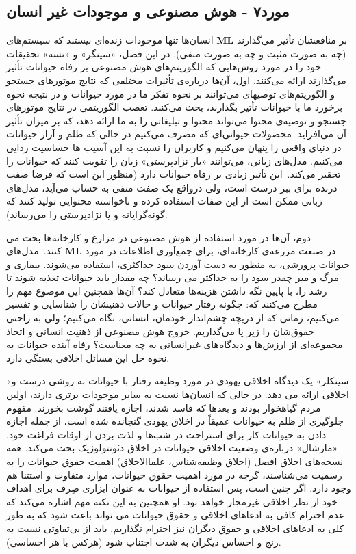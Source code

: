 \subsection*{مورد۷ - هوش مصنوعی و موجودات غیر انسان}
\label{subsec:مورد۷ - هوش مصنوعی و موجودات غیر انسان}
انسان‌ها تنها موجودات زنده‌ای نیستند که سیستم‌های \textenglish{\textbf{ML}} بر منافعشان تأثیر می‌گذارند (چه به صورت مثبت و چه به صورت منفی).
در این فصل، «سینگر» و «تسه» تحقیقات خود را در مورد روش‌هایی که الگوریتم‌های هوش مصنوعی بر رفاه حیوانات تأثیر می‌گذارند ارائه می‌کنند.
اول، آن‌ها درباره‌ی تأثیرات مختلفی که نتایج موتورهای جستجو و الگوریتم‌های توصیهای می‌توانند بر نحوه تفکر ما در مورد حیوانات و در نتیجه نحوه برخورد ما با حیوانات تأثیر بگذارند، بحث می‌کنند.
تعصب الگوریتمی در نتایج موتورهای جستجو و توصیه‌ی محتوا می‌تواند محتوا و تبلیغاتی را به ما ارائه دهد، که بر میزان تأثیر آن می‌افزاید.
محصولات حیوانی‌ای که مصرف می‌کنیم در حالی که ظلم و آزار حیوانات در دنیای واقعی را پنهان می‌کنیم و کاربران را نسبت به این آسیب ها حساسیت زدایی می‌کنیم.
مدل‌های زبانی، می‌توانند «بار نزادپرستی» زبان را تقویت کنند که حیوانات را تحقیر می‌کند.\     این تأثیر زیادی بر رفاه حیوانات دارد (منظور این است که فرضا صفت درنده برای ببر درست است، ولی درواقع یک صفت منفی به حساب می‌آید، مدل‌های زبانی ممکن است از این صفات استفاده کرده و ناخواسته محتوایی تولید کنند که گونه‌گرایانه و یا نژادپرستی را می‌رساند).

دوم، آن‌ها در مورد استفاده از هوش مصنوعی در مزارع و کارخانه‌ها بحث می کنند.\     مدل‌های \textenglish{\textbf{ML}} در صنعت مزرعه‌ی کارخانه‌ای، برای جمع‌آوری اطلاعات در مورد حیوانات پرورشی، به منظور به دست آوردن سود حداکثری، استفاده می‌شوند.
بیماری و مرگ و میر چقدر سود را به حداکثر می رساند؟ چه مقدار باید حیوانات تغذیه شوند تا رشد را، با پایین نگه داشتن هزینه‌ها متعادل کند؟ آن‌ها همچنین این موضوع مهم را مطرح می‌کنند که: چگونه رفتار حیوانات و حالات ذهنیشان را شناسایی و تفسیر می‌کنیم، زمانی که از دریچه چشم‌انداز خودمان، انسانی، نگاه می‌کنیم؛ ولی به راحتی حقوق‌شان را زیر پا می‌گذاریم.
خروج هوش مصنوعی از ذهنیت انسانی و اتخاذ مجموعه‌ای از ارزش‌ها و دیدگاه‌های غیرانسانی به چه معناست؟ رفاه آینده حیوانات به نحوه حل این مسائل اخلاقی بستگی دارد.

«سینکلر» یک دیدگاه اخلاقی یهودی در مورد وظیفه رفتار با حیوانات به روشی درست و اخلاقی ارائه می دهد.
در حالی که انسان‌ها نسبت به سایر موجودات برتری دارند، اولین مردم گیاهخوار بودند و بعدها که فاسد شدند، اجازه یافتند گوشت بخورند.
مفهوم جلوگیری از ظلم به حیوانات عمیقاً در اخلاق یهودی گنجانده شده است، از جمله اجازه دادن به حیوانات کار برای استراحت در شب‌ها و لذت بردن از اوقات فراغت خود.
«مارشال» درباره‌ی وضعیت اخلاقی حیوانات در اخلاق دئونتولوژیک بحث می‌کند.
همه نسخه‌های اخلاق افضل (اخلاق وظیفه‌شناس، علماالاخلاق) اهمیت حقوق حیوانات را به رسمیت می‌شناسند، گرچه در مورد اهمیت حقوق حیوانات، موارد متفاوت و استثنا هم وجود دارد.
اگر چنین است، پس استفاده از حیوانات به عنوان ابزاری صِرف برای اهداف خود از نظر اخلاقی غیرمجاز خواهد بود.
او همچنین به این نکته مهم اشاره می‌کند که عدم احترام کافی به ادعاهای اخلاقی و حقوق حیوانات می تواند باعث شود که به طور کلی به ادعاهای اخلاقی و حقوق دیگران نیز احترام نگذاریم.
باید از بی‌تفاوتی نسبت به رنج و احساس دیگران به شدت اجتناب شود (هرکس با هر احساسی).

